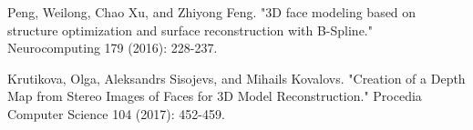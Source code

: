 \documentclass[journal]{IEEEtran}
\begin{document}
%
%
%
\begin{thebibliography}{9}

Peng, Weilong, Chao Xu, and Zhiyong Feng. "3D face modeling based on structure optimization and surface reconstruction with B-Spline." Neurocomputing 179 (2016): 228-237.

Krutikova, Olga, Aleksandrs Sisojevs, and Mihails Kovalovs. "Creation of a Depth Map from Stereo Images of Faces for 3D Model Reconstruction." Procedia Computer Science 104 (2017): 452-459.

\end{thebibliography}

% 










\end{document}
